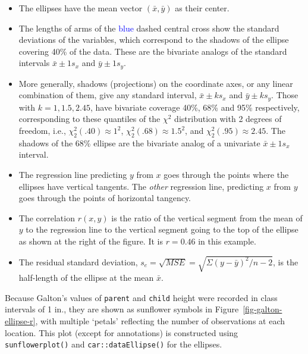 \documentclass[
  letterpaper,
  10pt,
  krantz2]{krantz}
\begin{document}
\begin{itemize}
\item
  The ellipses have the mean vector \((\bar{x}, \bar{y})\) as their
  center.
\item
  The lengths of arms of the \textcolor{blue}{blue} dashed central cross
  show the standard deviations of the variables, which correspond to the
  shadows of the ellipse covering 40\% of the data. These are the
  bivariate analogs of the standard intervals \(\bar{x} \pm 1 s_x\) and
  \(\bar{y} \pm 1 s_y\).
\item
  More generally, shadows (projections) on the coordinate axes, or any
  linear combination of them, give any standard interval,
  \(\bar{x} \pm k s_x\) and \(\bar{y} \pm k s_y\). Those with
  \(k=1, 1.5, 2.45\), have bivariate coverage 40\%, 68\% and 95\%
  respectively, corresponding to these quantiles of the \(\chi^2\)
  distribution with 2 degrees of freedom, i.e.,
  \(\chi^2_2 (.40) \approx 1^2\), \(\chi^2_2 (.68) \approx 1.5^2\), and
  \(\chi^2_2 (.95) \approx 2.45\). The shadows of the 68\% ellipse are
  the bivariate analog of a univariate \(\bar{x} \pm 1 s_x\) interval.
\item
  The regression line predicting \(y\) from \(x\) goes through the
  points where the ellipses have vertical tangents. The \emph{other}
  regression line, predicting \(x\) from \(y\) goes through the points
  of horizontal tangency.
\item
  The correlation \(r(x, y)\) is the ratio of the vertical segment from
  the mean of \(y\) to the regression line to the vertical segment going
  to the top of the ellipse as shown at the right of the figure. It is
  \(r = 0.46\) in this example.
\item
  The residual standard deviation,
  \(s_e = \sqrt{MSE} = \sqrt{\Sigma (y - \bar{y})^2 / n-2}\), is the
  half-length of the ellipse at the mean \(\bar{x}\).
\end{itemize}

Because Galton's values of \texttt{parent} and \texttt{child} height
were recorded in class intervals of 1 in., they are shown as sunflower
symbols in Figure~\ref{fig-galton-ellipse-r}, with multiple `petals'
reflecting the number of observations at each location. This plot
(except for annotations) is constructed using \texttt{sunflowerplot()}
and \texttt{car::dataEllipse()} for the ellipses.
\end{document}
